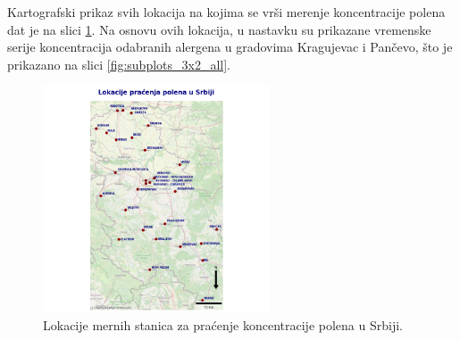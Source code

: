 \documentclass[12pt]{article}
\begin{document}
Kartografski prikaz svih lokacija na kojima se vrši merenje koncentracije polena dat je na slici \ref{fig:lokacije_polen_srbija}. 
Na osnovu ovih lokacija, u nastavku su prikazane vremenske serije koncentracija odabranih alergena u gradovima Kragujevac i Pančevo, 
što je prikazano na slici \ref{fig:subplots_3x2_all}.

\begin{figure}[H]
    \centering
    \includegraphics[width=0.6\textwidth]{grafici/mapa_lokacija.png}
    \caption{Lokacije mernih stanica za praćenje koncentracije polena u Srbiji.}
    \label{fig:lokacije_polen_srbija}
\end{figure}
\end{document}
